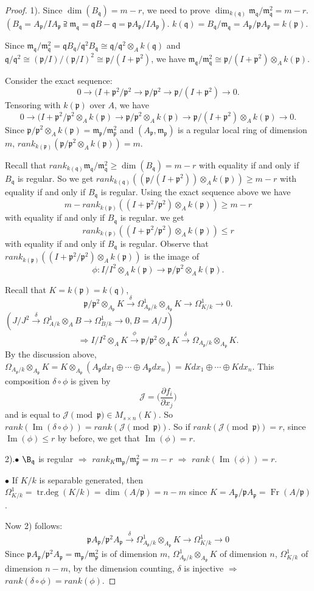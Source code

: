 \documentclass[cs4size]{article}
\newcommand{\rk}{rank}
\newcommand{\caJ}{\mathcal{J}}
\newcommand{\frm}{\mathfrak{m}}
\newcommand{\frp}{\mathfrak{p}}
\newcommand{\frq}{\mathfrak{q}}
\newcommand{\ra}{\rightarrow}
\newcommand{\xr}{\xrightarrow}
\newcommand{\Ra}{\Rightarrow}
\DeclareMathOperator{\Fr}{Fr}
\DeclareMathOperator{\Image}{Im}
\DeclareMathOperator{\trdeg}{tr.deg}
\begin{document}
\begin{proof}
1). Since $\dim(B_\frq)=m-r$, we need to prove $\dim_{k(\frq)}\frm_\frq/\frm_\frq^2=m-r$. $(B_\frq=A_\frp/IA_\frp\supseteqq \frm_\frq=\frq B-\frq=\frp A_\frp/IA_\frp)$. $k(\frq)=B_\frq/\frm_\frq=A_\frp/\frp A_\frp=k(\frp)$.

Since $\frm_\frq/\frm_\frq^2=\frq B_\frq/\frq^2B_\frq\cong \frq/\frq^2\otimes_Ak(\frq)$ and $\frq/\frq^2\cong (\frp/I)/(\frp/I)^2\cong \frp/(I+\frp^2)$, we have $\frm_\frq/\frm_\frq^2\cong \frp/(I+\frp^2)\otimes_Ak(\frp)$.

Consider the exact sequence:
\[0\ra (I+\frp^2/\frp^2\ra\frp/\frp^2\ra\frp/(I+\frp^2)\ra0.\]
Tensoring with $k(\frp)$ over $A$, we have
\[0\ra (I+\frp^2/\frp^2\otimes_Ak(\frp)\ra\frp/\frp^2\otimes_Ak(\frp)\ra\frp/(I+\frp^2)\otimes_Ak(\frp)\ra0.\]
Since $\frp/\frp^2\otimes_Ak(\frp)=\frm_\frp/\frm_\frp^2$ and $(A_\frp,\frm_\frp)$ is a regular local ring of dimension $m$, $\rk_{k(\frp)}(\frp/\frp^2\otimes_Ak(\frp))=m$.

Recall that $\rk_{k(\frq)}\frm_\frq/\frm_\frq^2\geq\dim(B_\frq)=m-r$ with equality if and only if $B_\frq$ is regular. So we get $\rk_{k(\frq)}((\frp/(I+\frp^2))\otimes_Ak(\frp))\geq m-r$ with equality if and only if $B_\frq$ is regular. Using the exact sequence above we have
\[m-\rk_{k(\frp)}((I+\frp^2/\frp^2)\otimes_Ak(\frp))\geq m-r\]
with equality if and only if $B_\frq$ is regular. we get
\[\rk_{k(\frp)}((I+\frp^2/\frp^2)\otimes_Ak(\frp))\leq r\]
with equality if and only if $B_\frq$ is regular. Observe that $\rk_{k(\frp)}((I+\frp^2/\frp^2)\otimes_Ak(\frp))$ is the image of
\[\phi:I/I^2\otimes_Ak(\frp)\ra\frp/\frp^2\otimes_Ak(\frp).\]

Recall that $K=k(\frp)=k(\frq)$,
\[\frp/\frp^2\otimes_{A_\frp}K\xr{\delta}\Omega_{A_\frp/k}^1\otimes_{A_\frp}K\ra \Omega_{K/k}^1\ra0.\]
$(J/J^2\xr{\delta}\Omega_{A/k}^1\otimes_AB\ra\Omega_{B/k}^1\ra 0, B=A/J)$
\[\Ra I/I^2\otimes_AK\xr{\phi}\frp/\frp^2\otimes_AK\xr{\delta}\Omega_{A_\frp/k}
\otimes_{A_\frp}K.\]
By the discussion above, $\Omega_{A_\frp/k}\otimes_{A_\frp}K=K\otimes_{A_\frp}(A_\frp dx_1\oplus \cdots \oplus A_\frp dx_n)=K dx_1\oplus\cdots\oplus K dx_n$.
This composition $\delta\circ\phi$ is given by
\[\caJ=\bigg(\frac{\partial f_i}{\partial x_j}\bigg)\]
and is equal to $\caJ\pmod{\frp}\in M_{s\times n}(K)$. So $\rk(\Image(\delta\circ \phi))=\rk(\caJ \pmod{\frp})$. So if $\rk(\caJ\pmod{\frp})=r$, since $\Image(\phi)\leq r$ by before, we get that $\Image(\phi)=r$.

2).$\bullet$ $\B_\frq$ is regular $\Ra$ $\rk_K\frm_\frp/\frm_\frp^2=m-r$ $\Ra$ $\rk(\Image(\phi))=r$.

$\bullet$ If $K/k$ is separable generated, then $\Omega_{K/k}^1=\trdeg(K/k)=\dim(A/\frp)=n-m$ since $K=A_\frp/\frp A_\frp=\Fr(A/\frp)$.

Now 2) follows:
\[\frp A_\frp/\frp^2 A_\frp\xr{\delta}\Omega_{A_\frp/k}^1\otimes_{A_\frp}K\ra\Omega_{K/k}^1\ra 0\]
Since $\frp A_\frp/\frp^2 A_\frp=\frm_\frp/\frm_\frp^2$ is of dimension $m$, $\Omega_{A_\frp/k}^1\otimes_{A_\frp}K$ of dimension $n$, $\Omega_{K/k}^1$ of dimension $n-m$, by the dimension counting, $\delta$ is injective $\Ra$ $\rk(\delta\circ \phi)=\rk(\phi)$.
\end{proof}
\end{document}
